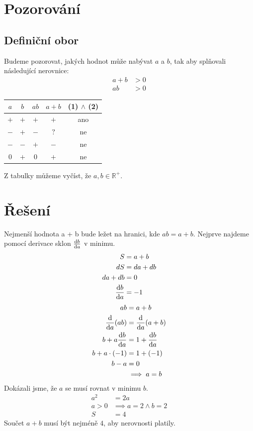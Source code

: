 \documentclass{MO}
\author{Dominik Dembinný}
\begin{document}
\makeMOheader

\section*{Pozorování}
\subsection*{Definiční obor}
Budeme pozorovat, jakých hodnot může nabývat $a$ a $b$, tak aby splňovali následující nerovnice:
\begin{align}
    a + b &> 0 \\
    ab &> 0
\end{align}
\begin{center}
    \begin{tabular}{|c|c|c|c|c|}
        \hline
        $a$ & $b$ & $ab$ & $a + b$ & (1) $\land$ (2) \\ \hline
        $+$ & $+$ & $+$ & $+$ & ano \\ \hline
        $-$ & $+$ & $-$ & $?$ & ne \\ \hline
        $-$ & $-$ & $+$ & $-$ & ne \\ \hline
        $0$ & $+$ & $0$ & $+$ & ne \\ \hline
    \end{tabular}
\end{center}
Z tabulky můžeme vyčíst, že $a, b \in \mathbb{R}^{+}$.

\section*{Řešení}
Nejmenší hodnota a + b bude ležet na hranici, kde $ab = a + b$.
Nejprve najdeme pomocí derivace sklon $\dv{b}{a}$ v minimu.
\begin{align*}
    S &= a + b \\
    dS &= da + db \\
    da + db &= 0 \\
    \dv{b}{a} &= -1
\end{align*}
\begin{align*}
    ab &= a + b \\
    \dv{a} (ab) &= \dv{a} (a + b) \\
    b + a \dv{b}{a} &= 1 + \dv{b}{a} \\
    b + a \cdot (-1) &= 1 + (-1) \\
    b - a &= 0 \\
    &\implies a = b
\end{align*}
Dokázali jsme, že $a$ se musí rovnat v minimu $b$.
\begin{align*}
    a^2 &= 2a \\
    a > 0 &\implies a = 2 \land b = 2 \\
    S &= 4
\end{align*}
Součet $a + b$ musí být nejméně $4$, aby nerovnosti platily.
\end{document}
